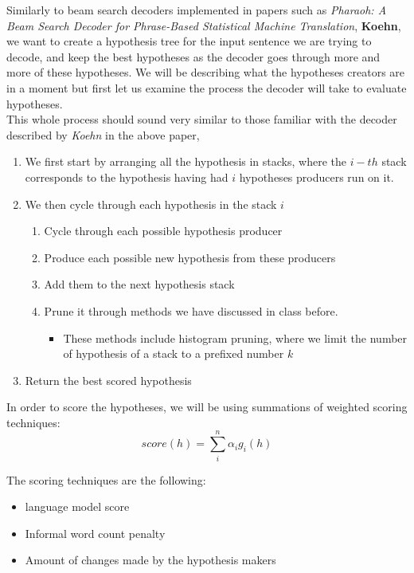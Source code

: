 \documentclass{article}
\begin{document}
Similarly to beam search decoders implemented in papers such as \textit{Pharaoh: A Beam Search Decoder for Phrase-Based Statistical Machine Translation}, \textbf{Koehn}, we want to create a hypothesis tree for the input sentence we are trying to decode, and keep the best hypotheses as the decoder goes through more and more of these hypotheses. We will be describing what the hypotheses creators are in a moment but first let us examine the process the decoder will take to evaluate hypotheses. \\

This whole process should sound very similar to those familiar with the decoder described by \textit{Koehn} in the above paper, 
\begin{enumerate}
	\item We first start by arranging all the hypothesis in stacks, where the $i-th$ stack corresponds to the hypothesis having had $i$ hypotheses producers run on it. 
	\item We then cycle through each hypothesis in the stack $i$
	\begin{enumerate}
		\item Cycle through each possible hypothesis producer
		\item Produce each possible new hypothesis from these producers
		\item Add them to the next hypothesis stack 
		\item Prune it through methods we have discussed in class before.
		\begin{itemize}
			\item These methods include histogram pruning, where we limit the number of hypothesis of a stack to a prefixed number $k$
		\end{itemize}
	\end{enumerate}
	\item Return the best scored hypothesis
\end{enumerate}

In order to score the hypotheses, we will be using summations of weighted scoring techniques: 
$$score(h) = \sum_{i}^{n}{\alpha_ig_i(h)}$$

The scoring techniques are the following:
\begin{itemize}
	\item language model score 
	\item Informal word count penalty
	\item Amount of changes made by the hypothesis makers
\end{itemize}
\end{document}
